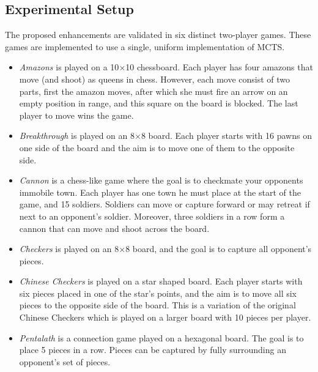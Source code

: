 \documentclass{ecai2014}
\begin{document}
\subsection{Experimental Setup}
\label{subsec:expsetup}
The proposed enhancements are validated in six distinct two-player games. These games are implemented to use a single, uniform implementation of MCTS.
\begin{itemize}
\item \emph{Amazons} is played on a 10$\times$10 chessboard. Each player has four amazons that move (and shoot) as queens in chess. However, each move consist of two parts, first the amazon moves, after which she must fire an arrow on an empty position in range, and this square on the board is blocked. The last player to move wins the game.
\item \emph{Breakthrough} is played on an 8$\times$8 board. Each player starts with 16 pawns on one side of the board and the aim is to move one of them to the opposite side.
\item \emph{Cannon} is a chess-like game where the goal is to checkmate your opponents immobile town. Each player has one town he must place at the start of the game, and 15 soldiers. Soldiers can move or capture forward or may retreat if next to an opponent's soldier. Moreover, three soldiers in a row form a cannon that can move and shoot across the board.
\item \emph{Checkers} is played on an 8$\times$8 board, and the goal is to capture all opponent's pieces.
\item \emph{Chinese Checkers} is played on a star shaped board. Each player starts with six pieces placed in one of the star's points, and the aim is to move all six pieces to the opposite side of the board. This is a variation of the original Chinese Checkers which is played on a larger board with 10 pieces per player.
\item \emph{Pentalath} is a connection game played on a hexagonal board. The goal is to place 5 pieces in a row. Pieces can be captured by fully surrounding an opponent's set of pieces.
\end{itemize}
\end{document}
